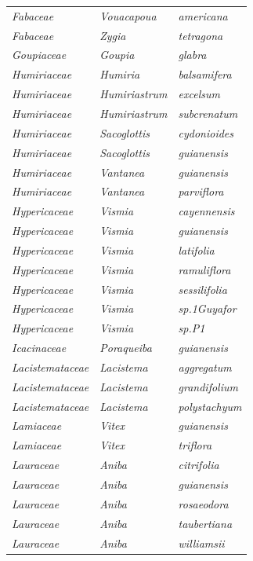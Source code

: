 \documentclass[fleqn,10pt]{ArtEcoFoG} %
\begin{document}
\begin{table}[t]
\begin{tabular}{lll}
\em{Fabaceae} & \em{Vouacapoua} & \em{americana}\\
\em{Fabaceae} & \em{Zygia} & \em{tetragona}\\
\em{Goupiaceae} & \em{Goupia} & \em{glabra}\\
\addlinespace
\em{Humiriaceae} & \em{Humiria} & \em{balsamifera}\\
\em{Humiriaceae} & \em{Humiriastrum} & \em{excelsum}\\
\em{Humiriaceae} & \em{Humiriastrum} & \em{subcrenatum}\\
\em{Humiriaceae} & \em{Sacoglottis} & \em{cydonioides}\\
\em{Humiriaceae} & \em{Sacoglottis} & \em{guianensis}\\
\addlinespace
\em{Humiriaceae} & \em{Vantanea} & \em{guianensis}\\
\em{Humiriaceae} & \em{Vantanea} & \em{parviflora}\\
\em{Hypericaceae} & \em{Vismia} & \em{cayennensis}\\
\em{Hypericaceae} & \em{Vismia} & \em{guianensis}\\
\em{Hypericaceae} & \em{Vismia} & \em{latifolia}\\
\addlinespace
\em{Hypericaceae} & \em{Vismia} & \em{ramuliflora}\\
\em{Hypericaceae} & \em{Vismia} & \em{sessilifolia}\\
\em{Hypericaceae} & \em{Vismia} & \em{sp.1Guyafor}\\
\em{Hypericaceae} & \em{Vismia} & \em{sp.P1}\\
\em{Icacinaceae} & \em{Poraqueiba} & \em{guianensis}\\
\addlinespace
\em{Lacistemataceae} & \em{Lacistema} & \em{aggregatum}\\
\em{Lacistemataceae} & \em{Lacistema} & \em{grandifolium}\\
\em{Lacistemataceae} & \em{Lacistema} & \em{polystachyum}\\
\em{Lamiaceae} & \em{Vitex} & \em{guianensis}\\
\em{Lamiaceae} & \em{Vitex} & \em{triflora}\\
\addlinespace
\em{Lauraceae} & \em{Aniba} & \em{citrifolia}\\
\em{Lauraceae} & \em{Aniba} & \em{guianensis}\\
\em{Lauraceae} & \em{Aniba} & \em{rosaeodora}\\
\em{Lauraceae} & \em{Aniba} & \em{taubertiana}\\
\em{Lauraceae} & \em{Aniba} & \em{williamsii}\\

\end{tabular}
\end{table}
\end{document}
